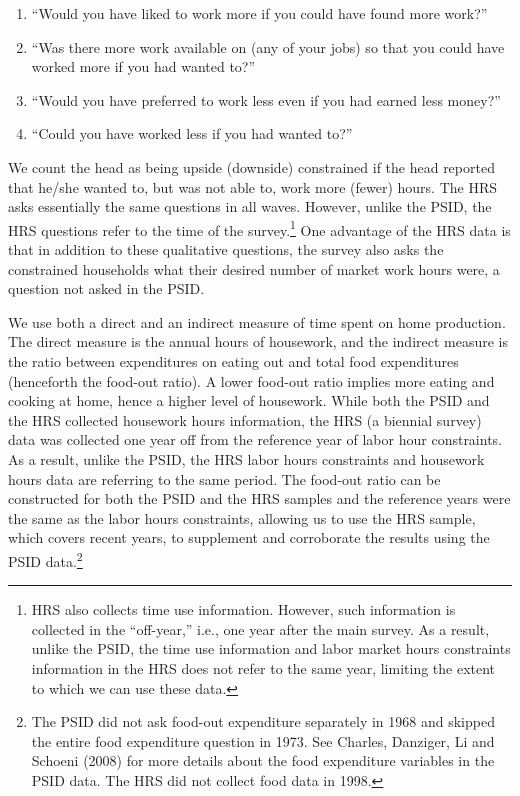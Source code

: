 \begin{enumerate}
\item {``Would you have liked to work more if you could have found more work?''}

\item {``Was there more work available on (any of your jobs) so that you could have worked more if you had wanted to?''}

\item {``Would you have preferred to work less even if you had earned less money?''}

\item {``Could you have worked less if you had wanted to?''}
\end{enumerate}

\noindent We count the head as being upside (downside) constrained if the head reported that he/she wanted to, but was not able to, work more (fewer) hours.  The HRS asks essentially the same questions in all waves. However, unlike the PSID, the HRS questions refer to the time of the survey.\footnote{HRS also collects time use information. However, such information is collected in the ``off-year,'' i.e., one year after the main survey. As a result, unlike the PSID, the time use information and labor market hours constraints information in the HRS does not refer to the same year, limiting the extent to which we can use these data.} One advantage of the HRS data is that in addition to these qualitative questions, the survey also asks the constrained households what their desired number of market work hours were, a question not asked in the PSID.

We use both a direct and an indirect measure of time spent on home production. The direct measure is the annual hours of housework, and the indirect measure is the ratio between expenditures on eating out and total food expenditures (henceforth the food-out ratio). A lower food-out ratio implies more eating and cooking at home, hence a higher level of housework. While both the PSID and the HRS collected housework hours information, the HRS (a biennial survey) data was collected one year off from the reference year of labor hour constraints. As a result, unlike the PSID, the HRS labor hours constraints and housework hours data are referring to the same period.  The food-out ratio can be constructed for both the PSID and the HRS samples and the reference years were the same as the labor hours constraints, allowing us to use the HRS sample, which covers recent years, to supplement and corroborate the results using the PSID data.\footnote{The PSID did not ask food-out expenditure separately in 1968 and skipped the entire food expenditure question in 1973. See Charles, Danziger, Li and Schoeni (2008) for more details about the food expenditure variables in the PSID data. The HRS did not collect food data in 1998.}

